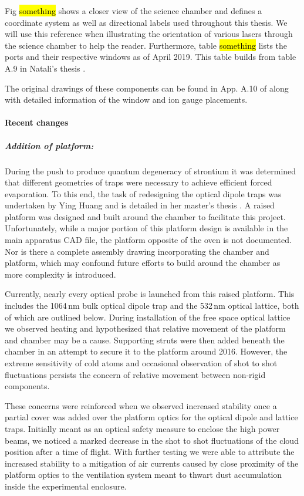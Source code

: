 Fig \hl{something} shows a closer view of the science chamber and defines a coordinate system as well as directional labels used throughout this thesis. 
We will use this reference when illustrating the orientation of various lasers through the science chamber to help the reader.
Furthermore, table \hl{something} lists the ports and their respective windows as of April 2019.
This table builds from table A.9 in Natali's thesis \cite{MartinezdeEscolar2010}.

The original drawings of these components can be found in App. A.10 of \cite{MartinezdeEscolar2010} along with detailed information of the window and ion gauge placements. 

\paragraph{Recent changes}
\subparagraph{Addition of platform:}
During the push to produce quantum degeneracy of strontium it was determined that different geometries of traps were necessary to achieve efficient forced evaporation. 
To this end, the task of redesigning the optical dipole traps was undertaken by Ying Huang and is detailed in her master's thesis \cite{Huang2013}. 
A raised platform was designed and built around the chamber to facilitate this project.
Unfortunately, while a major portion of this platform design is available in the main apparatus CAD file, the platform opposite of the oven is not documented.
Nor is there a complete assembly drawing incorporating the chamber and platform, which may confound future efforts to build around the chamber as more complexity is introduced. 

Currently, nearly every optical probe is launched from this raised platform.
This includes the 1064\,nm bulk optical dipole trap and the 532\,nm optical lattice, both of which are outlined below. 
During installation of the free space optical lattice we observed heating and hypothesized that relative movement of the platform and chamber may be a cause.
Supporting struts were then added beneath the chamber in an attempt to secure it to the platform around 2016.
However, the extreme sensitivity of cold atoms and occasional observation of shot to shot fluctuations persists the concern of relative movement between non-rigid components.

These concerns were reinforced when we observed increased stability once a partial cover was added over the platform optics for the optical dipole and lattice traps. 
Initially meant as an optical safety measure to enclose the high power beams, we noticed a marked decrease in the shot to shot fluctuations of the cloud position after a time of flight.
With further testing we were able to attribute the increased stability to a mitigation of air currents caused by close proximity of the platform optics to the ventilation system meant to thwart dust accumulation inside the experimental enclosure.

